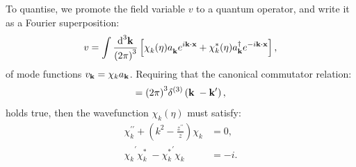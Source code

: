 To quantise, we promote the field variable \(v\) to a quantum operator, and write it as a Fourier superposition:
\begin{equation}
  v = \int \frac{\d[3]{\vk}}{{\left( 2\pi \right)}^3}
  \left[ 
    \chi_k^{\phantom\ast}(\eta) a_\vk^{\phantom\dagger}e^{i\vk\cdot\vx} + 
    \chi_k^\ast(\eta) a_\vk^{\dagger}e^{-i\vk\cdot\vx}  
  \right],
  \label{eqn:cos:mode_func_sum}
\end{equation}
of mode functions \(v_{\mathbf{k}} = \chi_k a_{\mathbf{k}}\).
Requiring that the canonical commutator relation:
\begin{equation}
  [ a_{\vk^{\phantom\prime}}^{\phantom\dagger}, a_{\vk^{\prime}}^{\dagger}] = {\left( 2\pi \right)}^3\delta^{(3)}\left( \vk^{\phantom\prime}-\vk^{\prime} \right),
  \label{eqn:cos:commutator}
\end{equation}
holds true, then the wavefunction \(\chi_k(\eta)\) must satisfy:
\begin{align}
  \chi_k^{\prime\prime} + \left( k^2 - \frac{z^{\prime\prime}}{z} \right) \chi_k &=0,
  \label{eqn:cos:mode_func}
  \\
  {\chi_k^{\phantom\ast}}^{\prime} 
  {\chi_k^{\ast}}^{\phantom\prime} 
  -
  {\chi_k^{\ast}}^{\prime} 
  {\chi_k^{\phantom\ast}}^{\phantom\prime} 
  &= -i.
  \label{eqn:cos:mode_func_normalisation}
\end{align}
